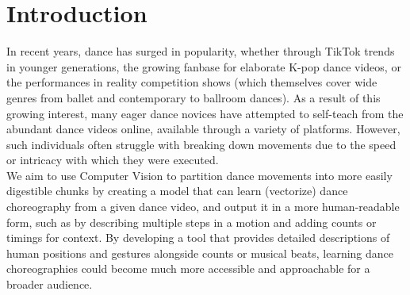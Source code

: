 \section{Introduction}
\label{sec:intro}

\indent In recent years, dance has surged in popularity, whether through TikTok trends in younger 
generations, the growing fanbase for elaborate K-pop dance videos, or the performances in 
reality competition shows (which themselves cover wide genres from ballet and contemporary 
to ballroom dances). As a result of this growing interest, many eager dance novices have 
attempted to self-teach from the abundant dance videos online, available through a variety 
of platforms. However, such individuals often struggle with breaking down movements due to 
the speed or intricacy with which they were executed.
\\
\indent We aim to use Computer Vision to partition dance movements into more easily digestible chunks 
by creating a model that can learn (vectorize) dance choreography from a given dance video, and 
output it in a more human-readable form, such as by describing multiple steps in a motion and 
adding counts or timings for context. By developing a tool that provides detailed descriptions 
of human positions and gestures alongside counts or musical beats, learning dance choreographies 
could become much more accessible and approachable for a broader audience.

